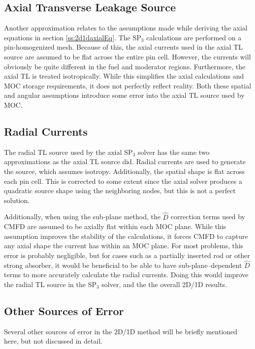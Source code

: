 \subsection{Axial Transverse Leakage Source}

Another approximation relates to the assumptions made while deriving the axial equations in section \ref{ss:2d1daxialEq}.  The SP$_3$ calculations are performed on a pin-homogenized mesh.  Because of this, the axial currents used in the axial TL source are assumed to be flat across the entire pin cell.  However, the currents will obviously be quite different in the fuel and moderator regions.  Furthermore, the axial TL is treated isotropically.  While this simplifies the axial calculations and MOC storage requirements, it does not perfectly reflect reality.  Both these spatial and angular assumptions introduce some error into the axial TL source used by MOC.

\subsection{Radial Currents}

The radial TL source used by the axial SP$_3$ solver has the same two approximations as the axial TL source did.  Radial currents are used to generate the source, which assumes isotropy.  Additionally, the spatial shape is flat across each pin cell.  This is corrected to some extent since the axial solver produces a quadratic source shape using the neighboring nodes, but this is not a perfect solution.

Additionally, when using the sub-plane method, the $\hat{D}$ correction terms used by CMFD are assumed to be axially flat within each MOC plane.  While this assumption improves the stability of the calculations, it forces CMFD to capture any axial shape the current has within an MOC plane.  For most problems, this error is probably negligible, but for cases such as a partially inserted rod or other strong absorber, it would be beneficial to be able to have sub-plane--dependent $\hat{D}$ terms to more accurately calculate the radial currents.  Doing this would improve the radial TL source in the SP$_3$ solver, and the the overall 2D/1D results.

\subsection{Other Sources of Error}

Several other sources of error in the 2D/1D method will be briefly mentioned here, but not discussed in detail.

